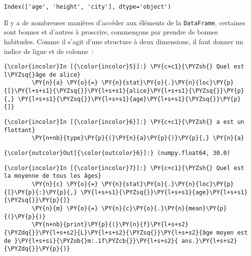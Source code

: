     \begin{Verbatim}[commandchars=\\\{\},frame=single,framerule=0.3mm,rulecolor=\color{cellframecolor}]
Index(['age', 'height', 'city'], dtype='object')
\end{Verbatim}

    Il y a de nombreuses manières d'accéder aux éléments de la
\texttt{DataFrame}, certaines sont bonnes et d'autres à proscrire,
commençons par prendre de bonnes habitudes. Comme il s'agit d'une
structure à deux dimensions, il faut donner un indice de ligne et de
colonne~:

    \begin{Verbatim}[commandchars=\\\{\},frame=single,framerule=0.3mm,rulecolor=\color{cellframecolor}]
{\color{incolor}In [{\color{incolor}5}]:} \PY{c+c1}{\PYZsh{} Quel est l\PYZsq{}âge de alice}
        \PY{n}{a} \PY{o}{=} \PY{n}{stat}\PY{o}{.}\PY{n}{loc}\PY{p}{[}\PY{l+s+s1}{\PYZsq{}}\PY{l+s+s1}{alice}\PY{l+s+s1}{\PYZsq{}}\PY{p}{,} \PY{l+s+s1}{\PYZsq{}}\PY{l+s+s1}{age}\PY{l+s+s1}{\PYZsq{}}\PY{p}{]}
\end{Verbatim}


    \begin{Verbatim}[commandchars=\\\{\},frame=single,framerule=0.3mm,rulecolor=\color{cellframecolor}]
{\color{incolor}In [{\color{incolor}6}]:} \PY{c+c1}{\PYZsh{} a est un flottant}
        \PY{n+nb}{type}\PY{p}{(}\PY{n}{a}\PY{p}{)}\PY{p}{,} \PY{n}{a}
\end{Verbatim}


\begin{Verbatim}[commandchars=\\\{\},frame=single,framerule=0.3mm,rulecolor=\color{cellframecolor}]
{\color{outcolor}Out[{\color{outcolor}6}]:} (numpy.float64, 30.0)
\end{Verbatim}
            
    \begin{Verbatim}[commandchars=\\\{\},frame=single,framerule=0.3mm,rulecolor=\color{cellframecolor}]
{\color{incolor}In [{\color{incolor}7}]:} \PY{c+c1}{\PYZsh{} Quel est la moyenne de tous les âges}
        \PY{n}{c} \PY{o}{=} \PY{n}{stat}\PY{o}{.}\PY{n}{loc}\PY{p}{[}\PY{p}{:}\PY{p}{,} \PY{l+s+s1}{\PYZsq{}}\PY{l+s+s1}{age}\PY{l+s+s1}{\PYZsq{}}\PY{p}{]}
        \PY{n}{m} \PY{o}{=} \PY{n}{c}\PY{o}{.}\PY{n}{mean}\PY{p}{(}\PY{p}{)}
        \PY{n+nb}{print}\PY{p}{(}\PY{n}{f}\PY{l+s+s2}{\PYZdq{}}\PY{l+s+s2}{L}\PY{l+s+s2}{\PYZsq{}}\PY{l+s+s2}{âge moyen est de }\PY{l+s+si}{\PYZob{}m:.1f\PYZcb{}}\PY{l+s+s2}{ ans.}\PY{l+s+s2}{\PYZdq{}}\PY{p}{)}
\end{Verbatim}


